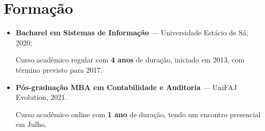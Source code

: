 \section{Formação}

\begin{itemize}
  \item \textbf{Bacharel em Sistemas de Informação} --- Universidade Estácio de Sá, 2020;

    Curso acadêmico regular com \textbf{4 anos} de duração, iniciado em
    2013, com término previsto para 2017.

  \item \textbf{Pós-graduação MBA em Contabilidade e Auditoria} --- UniFAJ Evolution, 2021.

    Curso acadêmico online com \textbf{1 ano} de duração, tendo um encontro
    presencial em Julho.
\end{itemize}

